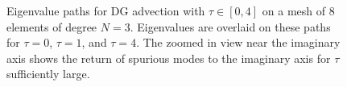 \documentclass[preprint,10pt]{elsarticle}
\begin{document}
\begin{figure}
\centering
{}
\hspace{1em}
\caption{Eigenvalue paths for DG advection with $\tau \in [0,4]$ on a mesh of 8 elements of degree $N=3$.  Eigenvalues are overlaid on these paths for $\tau = 0$, $\tau = 1$, and $\tau = 4$.  The zoomed in view near the imaginary axis shows the return of spurious modes to the imaginary axis for $\tau$ sufficiently large. }
\label{fig:track1D}
\end{figure}
\end{document}

